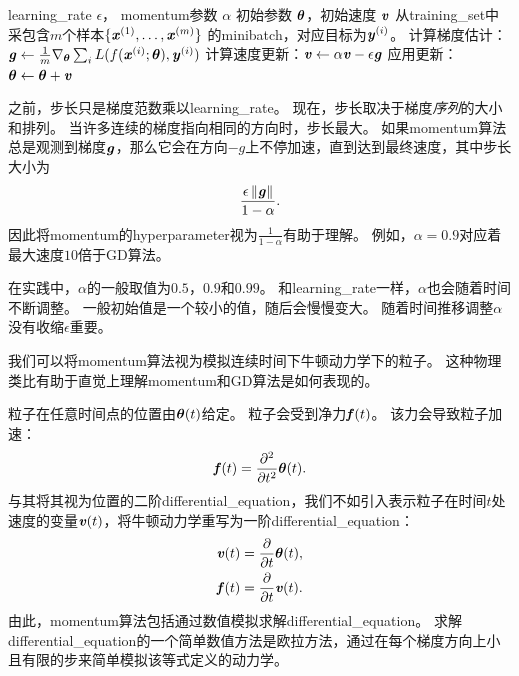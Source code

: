 

\begin{algorithm}[ht]
\caption{使用\gls{momentum}的\gls{SGD}（）}
\label{alg:momentum}
\begin{algorithmic}
\REQUIRE \gls{learning_rate} $\epsilon$， \gls{momentum}参数 $\alpha$
\REQUIRE 初始参数 $\boldsymbol{\theta}$，初始速度 $\boldsymbol{\mathit{v}}$
    \STATE 从\gls{training_set}中采包含$m$个样本$\{ \boldsymbol{\mathit{x}}^{(1)},\dots, \boldsymbol{\mathit{x}}^{(m)}\}$ 的\gls{minibatch}，对应目标为$\boldsymbol{\mathit{y}}^{(i)}$。
    \STATE 计算梯度估计：$\boldsymbol{\mathit{g}} \leftarrow 
         \frac{1}{m} \nabla_{\boldsymbol{\theta}} \sum_i L(f(\boldsymbol{\mathit{x}}^{(i)};\boldsymbol{\theta}),\boldsymbol{\mathit{y}}^{(i)})$
    \STATE  计算速度更新：$\boldsymbol{\mathit{v}} \leftarrow \alpha \boldsymbol{\mathit{v}} - 
    \epsilon \boldsymbol{\mathit{g}}$
    \STATE 应用更新：$\boldsymbol{\theta} \leftarrow \boldsymbol{\theta} + \boldsymbol{\mathit{v}}$ 
\ENDWHILE
\end{algorithmic}
\end{algorithm}



之前，步长只是梯度范数乘以\gls{learning_rate}。
现在，步长取决于梯度\emph{序列}的大小和排列。
当许多连续的梯度指向相同的方向时，步长最大。
如果\gls{momentum}算法总是观测到梯度$\boldsymbol{\mathit{g}}$，那么它会在方向$-g$上不停加速，直到达到最终速度，其中步长大小为
\begin{equation}
    \frac{\epsilon \left\lVert\boldsymbol{\mathit{g}}\right\rVert}{1-\alpha} .
\end{equation}
因此将\gls{momentum}的\gls{hyperparameter}视为$\frac{1}{1-\alpha}$有助于理解。
例如，$\alpha=0.9$对应着最大速度$10$倍于\gls{GD}算法。


在实践中，$\alpha$的一般取值为$0.5$，$0.9$和$0.99$。
和\gls{learning_rate}一样，$\alpha$也会随着时间不断调整。 
一般初始值是一个较小的值，随后会慢慢变大。
随着时间推移调整$\alpha$没有收缩$\epsilon$重要。


我们可以将\gls{momentum}算法视为模拟连续时间下牛顿动力学下的粒子。
这种物理类比有助于直觉上理解\gls{momentum}和\gls{GD}算法是如何表现的。


粒子在任意时间点的位置由$\boldsymbol{\theta}(t)$给定。
粒子会受到净力$\boldsymbol{\mathit{f}}(t)$。
该力会导致粒子加速：
\begin{equation}
    \boldsymbol{\mathit{f}}(t) = \frac{\partial^2}{\partial t^2} \boldsymbol{\theta}(t) .
\end{equation}
与其将其视为位置的二阶\gls{differential_equation}，我们不如引入表示粒子在时间$t$处速度的变量$\boldsymbol{\mathit{v}}(t)$，将牛顿动力学重写为一阶\gls{differential_equation}：
\begin{align}
    \boldsymbol{\mathit{v}}(t) &= \frac{\partial}{\partial t} \boldsymbol{\theta}(t) , \\
    \boldsymbol{\mathit{f}}(t) &= \frac{\partial}{\partial t} \boldsymbol{\mathit{v}}(t) .
\end{align}
由此，\gls{momentum}算法包括通过数值模拟求解\gls{differential_equation}。
求解\gls{differential_equation}的一个简单数值方法是欧拉方法，通过在每个梯度方向上小且有限的步来简单模拟该等式定义的动力学。


